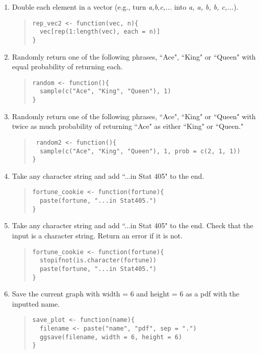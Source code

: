 \documentclass{article}
\begin{document}
\begin{enumerate}
\item Double each element in a vector (e.g., turn \emph{a,b,c,...} into \emph{a, a, b, b, c,...}).
  \begin{quote}
    \begin{verbatim}
rep_vec2 <- function(vec, n){
  vec[rep(1:length(vec), each = n)]
}
    \end{verbatim}
  \end{quote}


\item Randomly return one of the following phrases, ``Ace", ``King" or ``Queen" with equal probability of returning each.
  \begin{quote}
    \begin{verbatim}
random <- function(){
  sample(c("Ace", "King", "Queen"), 1)
}
    \end{verbatim}
  \end{quote}

\item Randomly return one of the following phrases, ``Ace", ``King" or ``Queen" with twice as much probability of returning ``Ace" as either ``King" or ``Queen."
  \begin{quote}
    \begin{verbatim}
 random2 <- function(){
  sample(c("Ace", "King", "Queen"), 1, prob = c(2, 1, 1))
}
    \end{verbatim}
  \end{quote}

\item Take any character string and add ``...in Stat 405" to the end.
  \begin{quote}
    \begin{verbatim}
fortune_cookie <- function(fortune){
  paste(fortune, "...in Stat405.")
}
    \end{verbatim}
  \end{quote}

\item Take any character string and add ``...in Stat 405" to the end. Check that the input is a character string. Return an error if it is not.
  \begin{quote}
    \begin{verbatim}
fortune_cookie <- function(fortune){
  stopifnot(is.character(fortune))
  paste(fortune, "...in Stat405.")
}	
    \end{verbatim}
  \end{quote}


\item Save the current graph with width = 6 and height = 6 as a pdf with the inputted name.
  \begin{quote}
    \begin{verbatim}
save_plot <- function(name){
  filename <- paste("name", "pdf", sep = ".")
  ggsave(filename, width = 6, height = 6)
}    
    \end{verbatim}
  \end{quote}


\end{enumerate}
\end{document}
